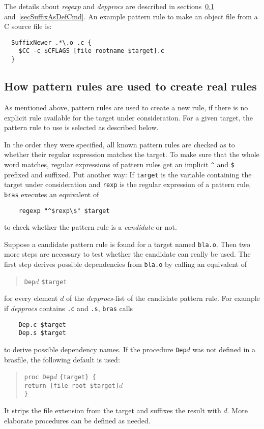 \documentclass[12pt]{article}
\newcommand{\bras}{\texttt{bras}}
\begin{document}
The details about \textit{regexp} and \textit{depprocs} are described
in sections~\ref{secSuffixToReal} and~\ref{secSuffixAsDefCmd}.
An example pattern rule to make an object file from a C source file is:
\begin{verbatim}
  SuffixNewer .*\.o .c {
    $CC -c $CFLAGS [file rootname $target].c
  }
\end{verbatim}

\subsection{How pattern rules are used to create real rules}
\label{secSuffixToReal}

As mentioned above, pattern rules are used to create a new rule, if
there is no explicit rule available for the target under
consideration. 
For a given target, the pattern rule to use is selected as described
below.

In the order they were specified, all known pattern rules are checked
as to whether their regular expression matches the target. To make
sure that the whole word matches, regular expressions of pattern rules
get an implicit \verb+^+ and \texttt{\$} prefixed and suffixed. Put
another way: If \texttt{target} is the variable containing the target
under consideration and \texttt{rexp} is the regular expression of a
pattern rule, \bras{} executes an equivalent of
\begin{verbatim}
    regexp "^$rexp\$" $target
\end{verbatim}
to check whether the pattern rule is a \textit{candidate} or not.

Suppose a candidate pattern rule is found for a target named
\texttt{bla.o}. Then two more steps are necessary
to test whether the candidate can really be used.
The first step derives possible dependencies
from \texttt{bla.o} by calling
an equivalent of
\begin{quote}
    \texttt{Dep}$d$ \texttt{\$target}
\end{quote}
for every element $d$ of the \textit{depprocs}-list of the candidate
pattern rule. For example if \textit{depprocs} contains \texttt{.c}
and \texttt{.s}, \bras{} calls
\begin{verbatim}
    Dep.c $target
    Dep.s $target
\end{verbatim}
to derive possible dependency names. If the procedure \texttt{Dep$d$}
was not defined in a brasfile, the following
default is used:
\begin{quote}
    \verb|proc Dep|$d$ \verb|{target} {|\\
    \texttt{\hspace*{2em}return [file root \$target]$d$}\\
    \verb|}|
\end{quote}
It strips the file extension from the target and suffixes the
result with $d$. More elaborate procedures can be defined as needed.
\end{document}
